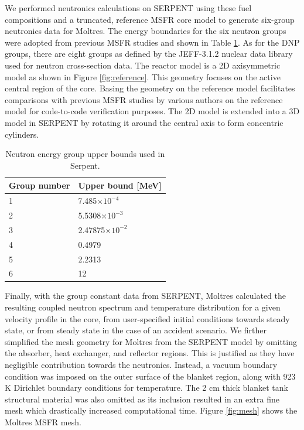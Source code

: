 \documentclass{anstrans}
\begin{document}
	We performed neutronics calculations on SERPENT using these fuel
	compositions and a truncated, reference \gls{MSFR} core model
	\cite{pettersen_coupled_2016} to generate six-group neutronics data for
	Moltres.
	The energy boundaries for the six neutron groups were adopted from previous
	\gls{MSFR} studies and shown in Table \ref{table:bound}.
	As for the \gls{DNP} groups, there are eight groups as defined by the
	JEFF-3.1.2 nuclear data library used for neutron cross-section data.
	The reactor model is a 2D axisymmetric model as shown in
	Figure \ref{fig:reference}. This geometry focuses on the active central
	region of the core. Basing the geometry on the reference model facilitates
	comparisons with previous MSFR studies by various authors
	\cite{fiorina_modelling_2014} \cite{pettersen_coupled_2016} on the
	reference model for code-to-code verification purposes.
	The 2D model is extended into a 3D model in SERPENT by rotating it
	around the central axis to form concentric cylinders.
	
\begin{table}[b]
	\centering
	\captionsetup{justification=centering}
	\caption{Neutron energy group upper bounds used in Serpent.}
	\begin{tabular}{ll}
		\hline
		{Group number} & {Upper bound [MeV]}\\
		\hline
		1 & 7.485$\times 10^{-4}$\\
		2 & 5.5308$\times 10^{-3}$\\
		3 & 2.47875$\times 10^{-2}$\\
		4 & 0.4979\\
		5 & 2.2313\\
		6 & 12\\
		\hline
	\end{tabular}
	\label{table:bound}
\end{table}	
	
	Finally, with the group constant data from SERPENT, Moltres
	calculated the resulting coupled neutron spectrum and temperature
	distribution for a given velocity profile in the core, from user-specified
	initial conditions towards steady state, or from steady state in the case
	of an accident scenario. We firther simplified the mesh geometry for
	Moltres from the SERPENT model by omitting the absorber,
	heat exchanger, and reflector regions. This is justified as they have
	negligible contribution towards the neutronics. Instead, a vacuum
	boundary condition was imposed on the outer surface of the blanket region,
	along with 923 K Dirichlet boundary conditions for temperature.
	The 2 cm thick blanket tank structural material was also omitted as its
	inclusion resulted in an extra fine mesh which drastically
	increased computational time. Figure \ref{fig:mesh} shows the Moltres
	\gls{MSFR} mesh.
	
\end{document}
